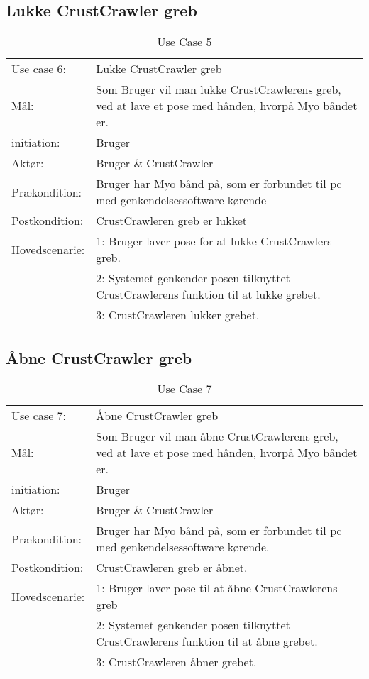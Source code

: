 \subsection{Lukke CrustCrawler greb}
\begin{center}
	\begin{table}[htbp]
		\begin{tabular}{lp{274pt}}
			\rowcolor{grey} Use case 6:		& Lukke CrustCrawler greb \\
			Mål: & Som Bruger vil man lukke CrustCrawlerens greb, ved at lave et pose  med hånden, hvorpå Myo båndet er. \\
			initiation:	& Bruger\\
			Aktør: & Bruger \& CrustCrawler\\
			Prækondition: & Bruger har Myo bånd på, som er forbundet til pc med genkendelsessoftware kørende \\
			Postkondition: & CrustCrawleren greb er lukket \\
			Hovedscenarie: & 1: Bruger laver pose for at lukke CrustCrawlers greb. \\
			& 2: Systemet genkender posen tilknyttet CrustCrawlerens funktion til at lukke grebet.\\
			& 3: CrustCrawleren lukker grebet.\\

		\end{tabular}
		\caption{Use Case 5}
	\end{table}
\end{center}

\subsection{Åbne CrustCrawler greb}
\begin{center}
	\begin{table}[htbp]
		\begin{tabular}{lp{274pt}}
			\rowcolor{grey} Use case 7:		& Åbne CrustCrawler greb\\
			Mål: & Som Bruger vil man åbne CrustCrawlerens greb, ved at lave et pose  med hånden, hvorpå Myo båndet er.\\
			initiation:	& Bruger \\
			Aktør: & Bruger \& CrustCrawler\\
			Prækondition: & Bruger har Myo bånd på, som er forbundet til pc med genkendelsessoftware kørende. \\
			Postkondition: & CrustCrawleren greb er åbnet. \\
			Hovedscenarie: & 1: Bruger laver pose til at åbne CrustCrawlerens greb\\
			& 2: Systemet genkender posen tilknyttet CrustCrawlerens funktion til at åbne grebet.\\
			& 3: CrustCrawleren åbner grebet.\\
		\end{tabular}
		\caption{Use Case 7}
	\end{table}
\end{center}

\egroup